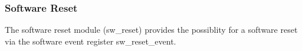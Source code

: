 \subsubsection{Software Reset} \label{sec:framework:software_reset}
The software reset module (sw\_reset) provides the possiblity for a software reset via the software event register sw\_reset\_event.

%

\clearpage

